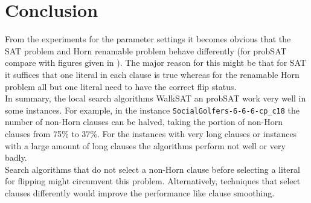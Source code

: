 \documentclass[12pt,a4paper]{article}
\begin{document}
\section{Conclusion}
From the experiments for the parameter settings it becomes  obvious that the SAT problem and Horn renamable problem behave differently (for probSAT compare with figures given in \cite{probSAT}). The major reason for this might be that for SAT it suffices that one literal in each clause is true whereas for the renamable Horn problem all but one literal need to have the correct flip status. \\

In summary, the local search algorithms WalkSAT an probSAT work very well in some instances. For example, in the instance \texttt{SocialGolfers-6-6-6-cp\_c18} the number of non-Horn clauses can be halved, taking the portion of non-Horn clauses from 75\% to 37\%. For the instances with very long clauses or instances with a large amount of long clauses the algorithms perform not well or very badly.\\
Search algorithms that do not select a non-Horn clause before selecting a literal for flipping might circumvent this problem. Alternatively, techniques that select clauses differently would improve the performance like clause smoothing.
\clearpage


\end{document}
